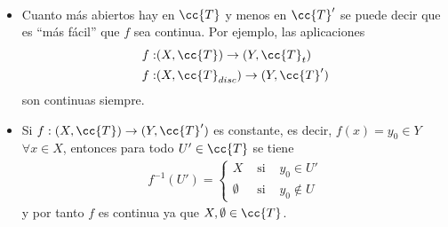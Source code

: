 \begin{observacion}\
    \begin{itemize}
        \item Cuanto más abiertos hay en $\cc{T}$ y menos en $\cc{T}'$ se puede decir que es ``más fácil'' que $f$ sea continua. Por ejemplo, las aplicaciones  
        \begin{align*}
            f:&(X, \cc{T})\to (Y, \cc{T}_t)\\
            f:&(X, \cc{T}_{disc})\to (Y, \cc{T}')
        \end{align*}
        son continuas siempre.

        \item Si $f:(X, \cc{T})\to (Y, \cc{T}')$ es constante, es decir, $f(x)=y_0\in Y$\ \ $\forall x \in X$, entonces para todo $U'\in \cc{T}$ se tiene 
        \begin{gather*}
            f^{-1}(U')=\left\{
            \begin{array}{ccc}
                X & \text{ si }& y_0\in U'\\
                \emptyset & \text{ si } & y_0\notin U
            \end{array}
            \right.
        \end{gather*}
        y por tanto $f$ es continua ya que $X, \emptyset \in \cc{T}$.


\end{itemize}
\end{observacion}
